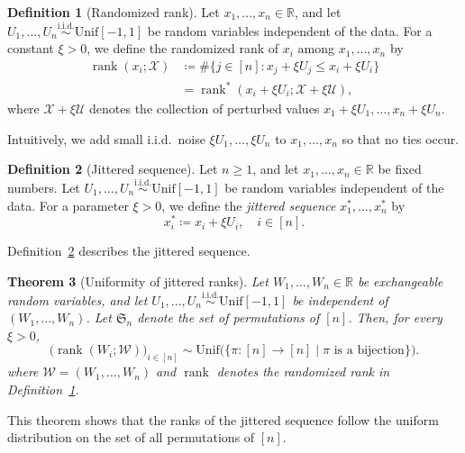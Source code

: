 \documentclass[a4paper,12pt]{article}
\numberwithin{equation}{section}
\newcommand{\iid}{\overset{\text{i.i.d.}}{\sim}}
\theoremstyle{plain}
\newtheorem{theorem}{Theorem}[section]
\theoremstyle{definition}
\newtheorem{definition}[theorem]{Definition}
\theoremstyle{remark}
\begin{document}
\begin{definition}[Randomized rank]
\label{definition:ch8-08}
    Let $x_1,\dots,x_n\in\mathbb{R}$, and let $U_1,\dots,U_n\iid\mathrm{Unif}[-1,1]$ be random variables independent of the data. For a constant $\xi>0$, we define the randomized rank of $x_i$ among $x_1,\dots,x_n$ by
    \begin{align}
        \operatorname{rank}(x_i;\mathcal{X})
        &\coloneqq\#\{j\in[n]:x_j+\xi U_j\leq x_i+\xi U_i\}\nonumber\\
        &=\operatorname{rank}^*(x_i+\xi U_i;\mathcal{X}+\xi\mathcal{U}),
        \label{eq:ch8-006}
    \end{align}
    where $\mathcal{X}+\xi\mathcal{U}$ denotes the collection of perturbed values $x_1+\xi U_1,\dots,x_n+\xi U_n$.
\end{definition}
Intuitively, we add small i.i.d.\ noise $\xi U_1,\dots,\xi U_n$ to $x_1,\dots,x_n$ so that no ties occur.

\begin{definition}[Jittered sequence]
\label{definition:ch8-09}
    Let $n\geq 1$, and let $x_1,\dots,x_n\in\mathbb{R}$ be fixed numbers. Let $U_1,\dots,U_n\iid\mathrm{Unif}[-1,1]$ be random variables independent of the data. For a parameter $\xi>0$, we define the \emph{jittered sequence} $x_1^*,\dots,x_n^*$ by
    \[
        x_i^*\coloneqq x_i+\xi U_i,\quad i\in[n].
    \]
\end{definition}

Definition~\ref{definition:ch8-09} describes the jittered sequence. 


\begin{theorem}[Uniformity of jittered ranks]
\label{theorem:ch8-10}
    Let $W_1,\dots,W_n\in\mathbb{R}$ be exchangeable random variables, and let $U_1,\dots,U_n\iid\mathrm{Unif}[-1,1]$ be independent of $(W_1,\dots,W_n)$. Let $\mathfrak{S}_n$ denote the set of permutations of $[n]$. Then, for every $\xi>0$,
    \[
    \bigl(\operatorname{rank}(W_i;\mathcal{W})\bigr)_{i\in[n]}
    \sim\mathrm{Unif}\bigl(\{\pi:[n]\to[n] \mid \pi \text{ is a bijection}\}\bigr).
    \]
    where $\mathcal{W}=(W_1,\dots,W_n)$ and $\operatorname{rank}$ denotes the randomized rank in Definition~\ref{definition:ch8-08}.
\end{theorem}
This theorem shows that the ranks of the jittered sequence follow the uniform distribution on the set of all permutations of $[n]$.
\end{document}
